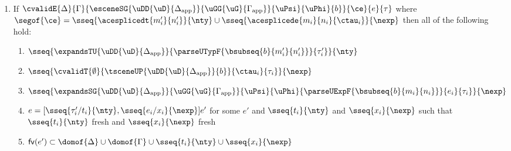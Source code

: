 \begin{lemma} 
\label{thm:proto-expression-expansion-decomposition} ~
\begin{enumerate}
\item If $\cvalidE
  {\Delta}{\Gamma}
  {\esceneSG
    {\uDD{\uD}{\Delta_\text{app}}}
    {\uGG{\uG}{\Gamma_\text{app}}}
    {\uPsi}{\uPhi}{b}
  }{\ce}{e}{\tau}$ where $\segof{\ce} = \sseq{\acesplicedt{m'_i}{n'_i}}{\nty} \cup \sseq{\acesplicede{m_i}{n_i}{\ctau_i}}{\nexp}$ then all of the following hold:
  \begin{enumerate}
    \item $\sseq{
          \expandsTU{\uDD{\uD}{\Delta_\text{app}}}
          {
            \parseUTypF{\bsubseq{b}{m'_i}{n'_i}}
          }{\tau'_i}
        }{\nty}$
    \item $\sseq{
      \cvalidT{\emptyset}{
        \tsceneUP
          {\uDD
            {\uD}{\Delta_\text{app}}
          }{b}
      }{
        \ctau_i
      }{\tau_i}
    }{\nexp}$
    \item $\sseq{
      \expandsSG
        {\uDD{\uD}{\Delta_\text{app}}}
        {\uGG{\uG}{\Gamma_\text{app}}}
        {\uPsi}
        {\uPhi}
        {\parseUExpF{\bsubseq{b}{m_i}{n_i}}}
        {e_i}
        {\tau_i}
    }{\nexp}$
    \item $e = [\sseq{\tau'_i/t_i}{\nty}, \sseq{e_i/x_i}{\nexp}]e'$ for some $e'$ and $\sseq{t_i}{\nty}$ and $\sseq{x_i}{\nexp}$ such that $\sseq{t_i}{\nty}$ fresh and $\sseq{x_i}{\nexp}$ fresh 
    \item $\mathsf{fv}(e') \subset \domof{\Delta} \cup \domof{\Gamma} \cup \sseq{t_i}{\nty} \cup \sseq{x_i}{\nexp}$
  \end{enumerate}
\end{enumerate}


\end{lemma}
